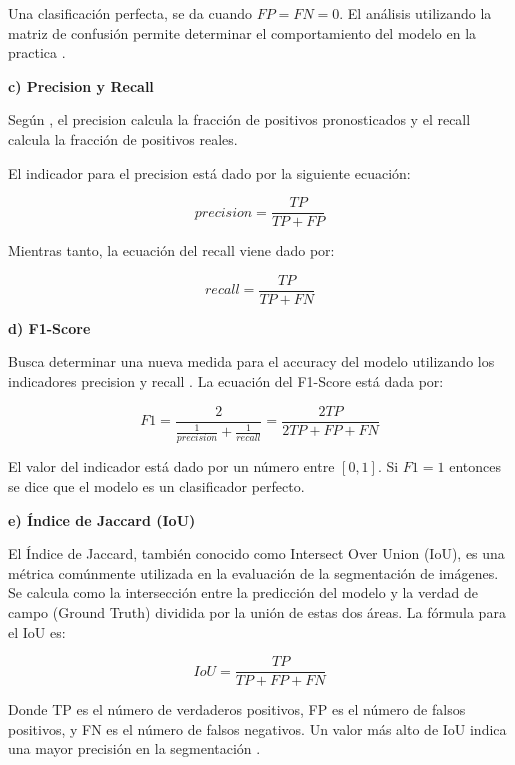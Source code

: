 Una clasificación perfecta, se da cuando $ FP = FN = 0 $.  El análisis utilizando la matriz de confusión permite determinar el comportamiento del modelo en la practica \cite{aghdam2017guide}.

\textbf{c) Precision y Recall}

Según , el precision calcula la fracción de positivos pronosticados y el recall calcula la fracción de positivos reales.

El indicador para el precision está dado por la siguiente ecuación:

\begin{equation}
    precision = \frac{TP}{TP + FP}
\end{equation}

Mientras tanto, la ecuación del recall viene dado por:

\begin{equation}
    recall = \frac{TP}{TP + FN}
\end{equation}

\textbf{d) F1-Score}

Busca determinar una nueva medida para el accuracy del modelo utilizando los indicadores precision y recall \cite{patterson2017deep}. La ecuación del F1-Score está dada por:

\begin{equation}
    F1 = \frac{2}{\frac{1}{precision} + \frac{1}{recall}} = \frac{2 TP}{2TP + FP + FN}
\end{equation}

El valor del indicador está dado por un número entre $ [0,1] $. Si $F1 = 1$ entonces se dice que el modelo es un clasificador perfecto.

\textbf{e) Índice de Jaccard (IoU)}

El Índice de Jaccard, también conocido como Intersect Over Union (IoU), es una métrica comúnmente utilizada en la evaluación de la segmentación de imágenes. Se calcula como la intersección entre la predicción del modelo y la verdad de campo (Ground Truth) dividida por la unión de estas dos áreas. La fórmula para el IoU es:

\begin{equation}
    IoU = \frac{TP}{TP + FP + FN}
\end{equation}

Donde TP es el número de verdaderos positivos, FP es el número de falsos positivos, y FN es el número de falsos negativos. Un valor más alto de IoU indica una mayor precisión en la segmentación \cite{patterson2017deep}.